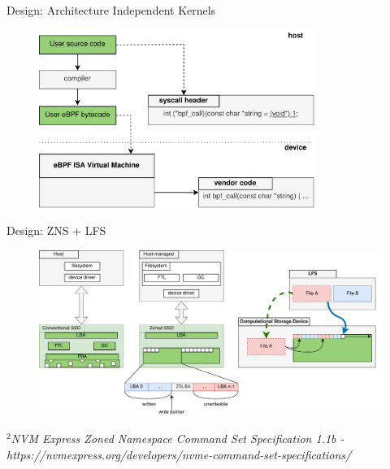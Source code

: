 \documentclass{beamer}
\begin{document}
% 
\begin{frame}{Design: Architecture Independent Kernels}
	\begingroup
	\begin{figure}
		\centering
		\includegraphics[width=0.8\textwidth]{resources/images/ubpf-medium-design.png}
	\end{figure}
	\endgroup
\end{frame}



\begin{frame}{Design: ZNS + LFS}
	\begingroup
	\small
	\begin{figure}[h]
		\centering
			  \includegraphics[width=1.0\linewidth]{resources/images/zns-lfs.png}
	\end{figure}
	\textit{\tiny $^{2}$NVM Express Zoned Namespace Command Set Specification 1.1b - https://nvmexpress.org/developers/nvme-command-set-specifications/}
	\endgroup
\end{frame}
\end{document}
